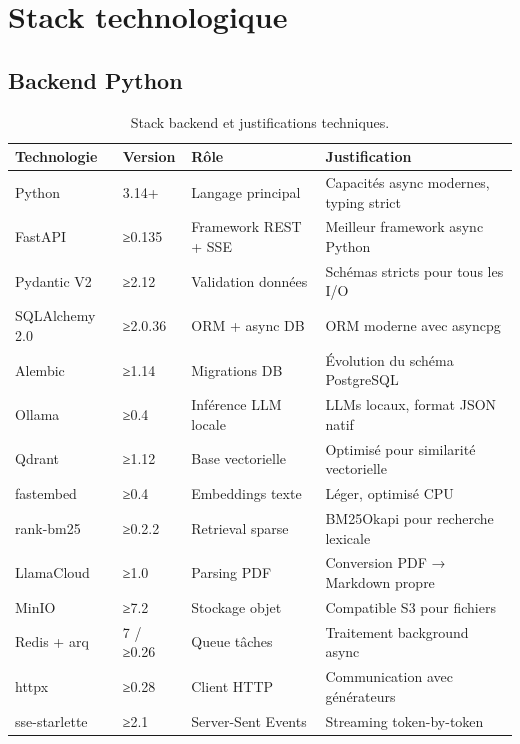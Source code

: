 \documentclass[12pt,a4paper]{article}
\begin{document}
\section{Stack technologique}

\subsection{Backend Python}

\begin{table}[H]
    \centering
    \small
    \begin{tabularx}{\textwidth}{@{}llXl@{}}
        \toprule
        \textbf{Technologie} & \textbf{Version} & \textbf{Rôle} & \textbf{Justification} \\
        \midrule
        Python & 3.14+ & Langage principal & Capacités async modernes, typing strict \\
        FastAPI & ≥0.135 & Framework REST + SSE & Meilleur framework async Python \\
        Pydantic V2 & ≥2.12 & Validation données & Schémas stricts pour tous les I/O \\
        SQLAlchemy 2.0 & ≥2.0.36 & ORM + async DB & ORM moderne avec asyncpg \\
        Alembic & ≥1.14 & Migrations DB & Évolution du schéma PostgreSQL \\
        Ollama & ≥0.4 & Inférence LLM locale & LLMs locaux, format JSON natif \\
        Qdrant & ≥1.12 & Base vectorielle & Optimisé pour similarité vectorielle \\
        fastembed & ≥0.4 & Embeddings texte & Léger, optimisé CPU \\
        rank-bm25 & ≥0.2.2 & Retrieval sparse & BM25Okapi pour recherche lexicale \\
        LlamaCloud & ≥1.0 & Parsing PDF & Conversion PDF → Markdown propre \\
        MinIO & ≥7.2 & Stockage objet & Compatible S3 pour fichiers \\
        Redis + arq & 7 / ≥0.26 & Queue tâches & Traitement background async \\
        httpx & ≥0.28 & Client HTTP & Communication avec générateurs \\
        sse-starlette & ≥2.1 & Server-Sent Events & Streaming token-by-token \\
        \bottomrule
    \end{tabularx}
    \caption{Stack backend et justifications techniques.}
\end{table}
\end{document}
